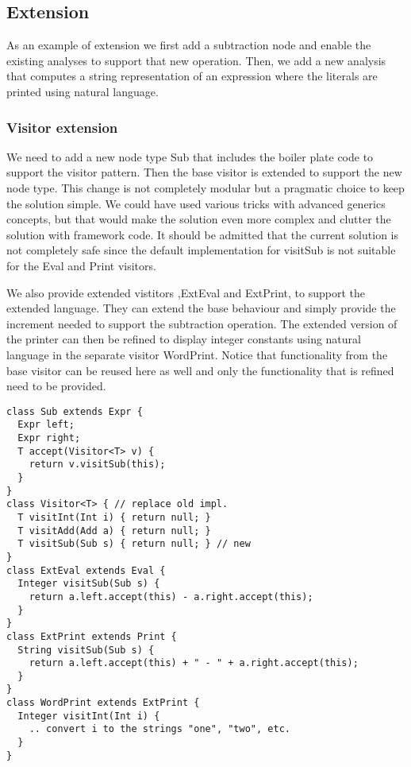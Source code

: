 \subsection{Extension}
As an example of extension we first add a subtraction node and enable the
existing analyses to support that new operation. Then, we add a new
analysis that computes a string representation of an expression where the
literals are printed using natural language.

\subsubsection{Visitor extension}
We need to add a new node type Sub that includes the boiler plate code to
support the visitor pattern. Then the base visitor is extended to support
the new node type. This change is not completely modular but a pragmatic
choice to keep the solution simple. We could have used various tricks with advanced
generics concepts, but that would make the solution even more complex and 
clutter the solution with framework code. It should be admitted that the 
current solution is not
completely safe since the default implementation for visitSub is not
suitable for the Eval and Print visitors. 

We also provide extended vistitors
,ExtEval and ExtPrint, to support the extended language.
They can extend the base behaviour and simply provide the increment
needed to support the subtraction operation. The extended version of the
printer can then be refined to display integer constants using natural
language in the separate visitor WordPrint. Notice that functionality from
the base visitor can be reused here as well and only the functionality 
that is refined need to be provided.

\begin{lstlisting}[caption={Visitor Extension}]
class Sub extends Expr {
  Expr left;
  Expr right;
  T accept(Visitor<T> v) {
    return v.visitSub(this);
  }
}
class Visitor<T> { // replace old impl.
  T visitInt(Int i) { return null; }
  T visitAdd(Add a) { return null; }
  T visitSub(Sub s) { return null; } // new
}
class ExtEval extends Eval {
  Integer visitSub(Sub s) {
    return a.left.accept(this) - a.right.accept(this);
  }
}
class ExtPrint extends Print {
  String visitSub(Sub s) {
    return a.left.accept(this) + " - " + a.right.accept(this);
  }
}
class WordPrint extends ExtPrint {
  Integer visitInt(Int i) {
    .. convert i to the strings "one", "two", etc.
  }
}
\end{lstlisting}

